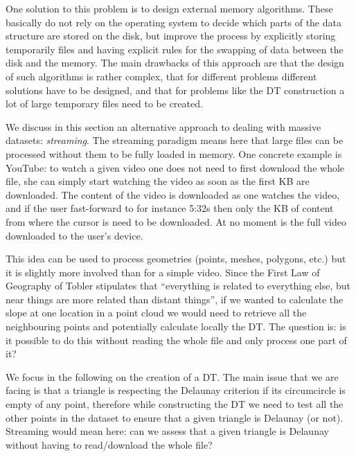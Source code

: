 %

One solution to this problem is to design external memory algorithms.%
These basically do not rely on the operating system to decide which parts of the data structure are stored on the disk, but improve the process by explicitly storing temporarily files and having explicit rules for the swapping of data between the disk and the memory. 
The main drawbacks of this approach are that the design of such algorithms is rather complex, that for different problems different solutions have to be designed, and that for problems like the DT construction a lot of large temporary files need to be created.

%

We discuss in this section an alternative approach to dealing with massive datasets: \emph{streaming}.%
The streaming paradigm means here that large files can be processed without them to be fully loaded in memory.
One concrete example is YouTube: to watch a given video one does not need to first download the whole file, she can simply start watching the video as soon as the first KB are downloaded.
The content of the video is downloaded as one watches the video, and if the user fast-forward to for instance 5:32s then only the KB of content from where the cursor is need to be downloaded.
At no moment is the full video downloaded to the user's device.

%

This idea can be used to process geometries (points, meshes, polygons, etc.) but it is slightly more involved than for a simple video.
Since the First Law of Geography of Tobler stipulates that ``everything is related to everything else, but near things are more related than distant things'', if we wanted to calculate the slope at one location in a point cloud we would need to retrieve all the neighbouring points and potentially calculate locally the DT\@.
The question is: is it possible to do this without reading the whole file and only process one part of it?

%

We focus in the following on the creation of a DT\@.
The main issue that we are facing is that a triangle is respecting the Delaunay criterion if its circumcircle is empty of any point, therefore while constructing the DT we need to test all the other points in the dataset to ensure that a given triangle is Delaunay (or not).
Streaming would mean here: can we assess that a given triangle is Delaunay without having to read/download the whole file?


